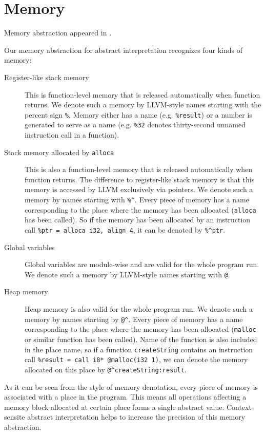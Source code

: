 \documentclass[a4paper]{book}
\begin{document}
\section{Memory}
Memory abstraction appeared in \cite{M06}.

Our memory abstraction for abstract interpretation recognizes four
kinds of memory:
\begin{description}
\item[Register-like stack memory] This is function-level memory that
  is released automatically when function returns.  We denote such a
  memory by LLVM-style names starting with the percent sign
  \texttt{\%}.  Memory either has a name (e.g. \texttt{\%result}) or a
  number is generated to serve as a name (e.g. \texttt{\%32} denotes
  thirty-second unnamed instruction call in a function).
\item[Stack memory allocated by \texttt{alloca}] This is also a
  function-level memory that is released automatically when function
  returns.  The difference to register-like stack memory is that this
  memory is accessed by LLVM exclusively via pointers.  We denote such
  a memory by names starting with \texttt{\%\^}.  Every piece of
  memory has a name corresponding to the place where the memory has
  been allocated (\texttt{alloca} has been called).  So if the memory
  has been allocated by an instruction call \texttt{\%ptr = alloca
    i32, align 4}, it can be denoted by \texttt{\%\^{}ptr}.
\item[Global variables] Global variables are module-wise and are valid
  for the whole program run.  We denote such a memory by LLVM-style
  names starting with \texttt{@}.
\item[Heap memory] Heap memory is also valid for the whole program
  run.  We denote such a memory by names starting by \texttt{@\^}.
  Every piece of memory has a name corresponding to the place where
  the memory has been allocated (\texttt{malloc} or similar function
  has been called).  Name of the function is also included in the
  place name, so if a function \texttt{createString} contains an
  instruction call \texttt{\%result = call i8* @malloc(i32 1)}, we can
  denote the memory allocated on this place by
  \texttt{@\^{}createString:result}.
\end{description}

As it can be seen from the style of memory denotation, every piece of
memory is associated with a place in the program.  This means all
operations affecting a memory block allocated at certain place forms a
single abstract value.  Context-sensite abstract interpretation helps
to increase the precision of this memory abstraction.
\end{document}
